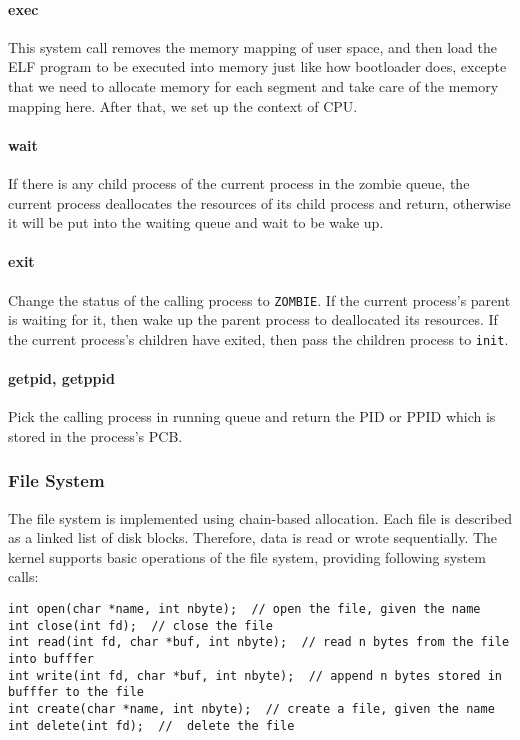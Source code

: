 \documentclass[12pt, a4paper]{article}
\begin{document}
\paragraph{exec}
This system call removes the memory mapping of user space, and then load the ELF program to be executed into memory just like how bootloader does, excepte that we need to allocate memory for each segment and take care of the memory mapping here. After that, we set up the context of CPU.

\paragraph{wait}
If there is any child process of the current process in the zombie queue, the current process deallocates the resources of its child process and return, otherwise it will be put into the waiting queue and wait to be wake up.

\paragraph{exit}
Change the status of the calling process to \verb|ZOMBIE|. If the current process's parent is waiting for it, then wake up the parent process to deallocated its resources. If the current process's children have exited, then pass the children process to \verb|init|.

\paragraph{getpid, getppid}
Pick the calling process in running queue and return the PID or PPID which is stored in the process's PCB.

\subsubsection{File System}
\label{filesystem}
The file system is implemented using chain-based allocation. Each file is described as a linked list of disk blocks. Therefore, data is read or wrote sequentially. The kernel supports basic operations of the file system, providing following system calls:
\begin{lstlisting}
int open(char *name, int nbyte);  // open the file, given the name
int close(int fd);  // close the file
int read(int fd, char *buf, int nbyte);  // read n bytes from the file into bufffer
int write(int fd, char *buf, int nbyte);  // append n bytes stored in bufffer to the file
int create(char *name, int nbyte);  // create a file, given the name
int delete(int fd);  //  delete the file
\end{lstlisting}
\end{document}
